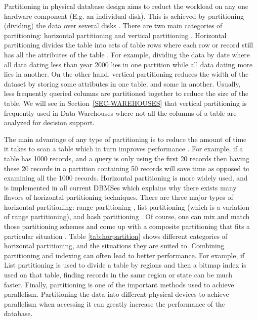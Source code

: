 \documentclass[12pt,a4paper]{article}
\begin{document}
Partitioning in physical database design aims to reduct the workload on any one hardware component (E.g. an individual disk). This is achieved by partitioning
(dividing) the data over several disks \cite{lightstone2007physical}. There are two main categories of partitioning: horizontal partitioning and vertical
partitioning \cite{agrawal2004integrating}. Horizontal partitioning divides the table into sets of table rows where each row or record still has all the
attributes of the table \cite{ceri1982horizontal, shin1985partitioning}. For example, dividing the data by date where all data dating less than year 2000 lies
in one partition while all data dating more lies in another. On the other hand, vertical partitioning reduces the width of the dataset by storing some
attributes in one table, and some in another. Usually, less frequently queried columns are partitioned together to reduce the size of the table. We will see in
Section~\ref{SEC-WAREHOUSES} that vertical partitioning is frequently used in Data Warehouses where not all the columns of a table are analyzed for decision
support.

The main advantage of any type of partitioning is to reduce the amount of time it takes to scan a table which in turn improves performance
\cite{lightstone2007physical}. For example, if a table has 1000 records, and a query is only using the first 20 records then having these 20 records in a
partition containing 50 records will save time as opposed to examining all the 1000 records. Horizontal partitioning is more widely used, and is implemented in
all current DBMSes \cite{mysqlpartitioning, sqlsrvpartitioning, sybasepartitioning, postgrepartitioning, oraclepartitioning, db2partitioning} which explains
why there exists many flavors of horizontal partitioning techniques. There are three major types of horizontal partitioning: range partitioning
\cite{dewitt1986gamma}, list partitioning \cite{lightstone2007physical} (which is a variation of range partitioning), and hash partitioning
\cite{lightstone2007physical}. Of course, one can mix and match those partitioning schemes and come up with a composite partitioning that fits a particular
situation \cite{lightstone2007physical}. Table \ref{tab:horpartition} shows different categories of horizontal partitioning, and the situations they are suited
to. Combining partitioning and indexing can often lead to better performance. For example, if List partitioning is used to divide a table by regions and then a
bitmap index is used on that table, finding records in the same region or state can be much faster. Finally, partitioning is one of the important
methods used to achieve parallelism. Partitioning the data into different physical
devices to achieve parallelism when accessing it can greatly increase the performance of the database.
\end{document}
